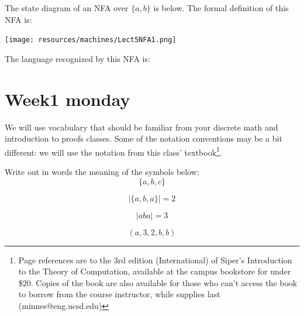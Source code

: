 \documentclass[12pt, oneside]{article}
\begin{document}
\newpage

The state diagram of an NFA over $\{a,b\}$ is below.  The formal definition of this NFA is:

\vspace{-30pt}

\texttt{[image: resources/machines/Lect5NFA1.png]}


\vspace{-10pt}

The language recognized by this NFA is:  \vfill
\section*{Week1 monday}


We will use vocabulary that should be familiar from your discrete 
math and introduction to proofs classes.  Some of the notation conventions may 
be a bit different: we will use the notation from this class' textbook\footnote{Page references are to 
the 3rd edition (International) of Siper's Introduction to the Theory of Computation,
available at the campus bookstore for under \$20. Copies of the book are also available 
for those who can't access the book
to borrow from the course instructor, while supplies last (minnes@eng.ucsd.edu)}.

Write out in words the meaning of the symbols below: 
\[
    \{ a,b, c\}
\]

\phantom{The set whose elements are $a$, $b$, and $c$}

\[
    | \{a, b, a \} | = 2
\]


\[
    | aba | = 3
\]

\phantom{The length of the string $aba$ is $3$.}

\[
    (a, 3, 2, b, b)
\]

\phantom{The $5$-tuple whose first components is $a$, second component 
is $3$, third component is $2$, fourth component is $b$, and fifth component is $b$.}
\end{document}
